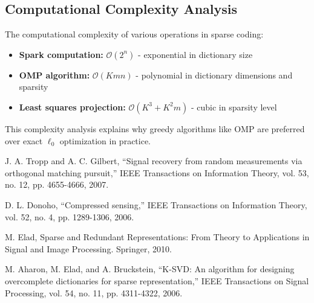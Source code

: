 \documentclass[12pt]{article}
\theoremstyle{definition}
\begin{document}
\subsection{Computational Complexity Analysis}

The computational complexity of various operations in sparse coding:

\begin{itemize}
    \item \textbf{Spark computation:} $\mathcal{O}(2^n)$ - exponential in dictionary size
    \item \textbf{OMP algorithm:} $\mathcal{O}(Kmn)$ - polynomial in dictionary dimensions and sparsity
    \item \textbf{Least squares projection:} $\mathcal{O}(K^3 + K^2m)$ - cubic in sparsity level
\end{itemize}

This complexity analysis explains why greedy algorithms like OMP are preferred over exact $\ell_0$ optimization in practice.


\begin{thebibliography}{9}

    J. A. Tropp and A. C. Gilbert, ``Signal recovery from random measurements via orthogonal matching pursuit,'' IEEE Transactions on Information Theory, vol. 53, no. 12, pp. 4655-4666, 2007.

    D. L. Donoho, ``Compressed sensing,'' IEEE Transactions on Information Theory, vol. 52, no. 4, pp. 1289-1306, 2006.

    M. Elad, Sparse and Redundant Representations: From Theory to Applications in Signal and Image Processing. Springer, 2010.

    M. Aharon, M. Elad, and A. Bruckstein, ``K-SVD: An algorithm for designing overcomplete dictionaries for sparse representation,'' IEEE Transactions on Signal Processing, vol. 54, no. 11, pp. 4311-4322, 2006.

\end{thebibliography}
\end{document}
